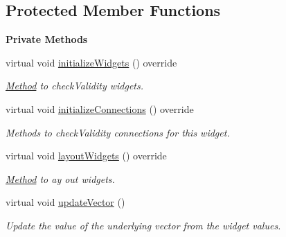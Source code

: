 \subsection*{Protected Member Functions}
\begin{Indent}\textbf{ Private Methods}\par
\begin{DoxyCompactItemize}
\item 
\mbox{\label{classrev_1_1_view_1_1_vector_widget_a23cee95f3f2608fbd4c74e75444e1e16}} 
virtual void \mbox{\hyperlink{classrev_1_1_view_1_1_vector_widget_a23cee95f3f2608fbd4c74e75444e1e16}{initialize\+Widgets}} () override
\begin{DoxyCompactList}\small\item\em \mbox{\hyperlink{struct_method}{Method}} to check\+Validity widgets. \end{DoxyCompactList}\item 
\mbox{\label{classrev_1_1_view_1_1_vector_widget_a28cc23f8d04a16218a812b8a85e73a1c}} 
virtual void \mbox{\hyperlink{classrev_1_1_view_1_1_vector_widget_a28cc23f8d04a16218a812b8a85e73a1c}{initialize\+Connections}} () override
\begin{DoxyCompactList}\small\item\em Methods to check\+Validity connections for this widget. \end{DoxyCompactList}\item 
\mbox{\label{classrev_1_1_view_1_1_vector_widget_a277fec17ba15c6a6dcd97e386570d0ea}} 
virtual void \mbox{\hyperlink{classrev_1_1_view_1_1_vector_widget_a277fec17ba15c6a6dcd97e386570d0ea}{layout\+Widgets}} () override
\begin{DoxyCompactList}\small\item\em \mbox{\hyperlink{struct_method}{Method}} to ay out widgets. \end{DoxyCompactList}\item 
\mbox{\label{classrev_1_1_view_1_1_vector_widget_a512e393b11921b3e934df884ec3e0f7d}} 
virtual void \mbox{\hyperlink{classrev_1_1_view_1_1_vector_widget_a512e393b11921b3e934df884ec3e0f7d}{update\+Vector}} ()
\begin{DoxyCompactList}\small\item\em Update the value of the underlying vector from the widget values. \end{DoxyCompactList}\end{DoxyCompactItemize}
\end{Indent}

